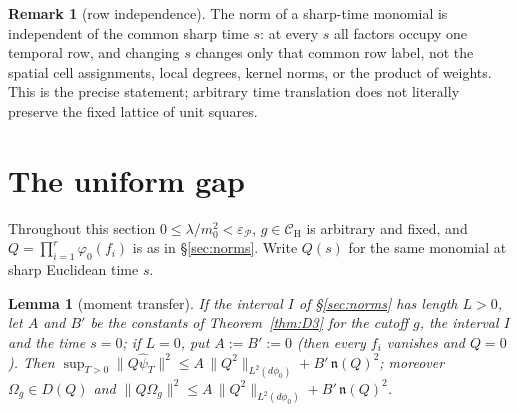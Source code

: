 \documentclass[11pt,a4paper]{article}
\theoremstyle{plain}
\newtheorem{lemma}[theorem]{Lemma}
\theoremstyle{definition}
\newtheorem{remark}[theorem]{Remark}
\theoremstyle{plain}
\theoremstyle{definition}
\newcommand{\CH}{\mathcal{C}_{\mathrm H}}
\newcommand{\Om}{\Omega}
\begin{document}
\begin{remark}[row independence]\label{rem:row}
The norm of a sharp-time monomial is independent of the common sharp time $s$: at every $s$
all factors occupy one temporal row, and changing $s$ changes only that common row label,
not the spatial cell assignments, local degrees, kernel norms, or the product of weights.
This is the precise statement; arbitrary time translation does not literally preserve the
fixed lattice of unit squares.
\end{remark}

\section{The uniform gap}\label{sec:G}

Throughout this section $0\le\lambda/m_0^2<\varepsilon_{\mathscr P}$, $g\in\CH$ is
arbitrary and fixed, and $Q=\prod_{i=1}^r\varphi_0(f_i)$ is as in \S\ref{sec:norms}. Write
$Q(s)$ for the same monomial at sharp Euclidean time $s$.

\begin{lemma}[moment transfer]\label{lem:transfer}
If the interval $I$ of \S\ref{sec:norms} has length $L>0$, let $A$ and $B'$ be the
constants of Theorem~\ref{thm:D3} for the cutoff $g$, the interval $I$ and the time $s=0$;
if $L=0$, put $A:=B':=0$ (then every $f_i$ vanishes and $Q=0$).  Then
$\displaystyle\sup_{T>0}\|Q\hat\psi_T\|^2\le A\,\|Q^2\|_{L^2(d\phi_0)}+B'\,\mathfrak n(Q)^2$;
moreover $\Om_g\in D(Q)$ and $\|Q\Om_g\|^2\le A\,\|Q^2\|_{L^2(d\phi_0)}+B'\,\mathfrak n(Q)^2$.
\end{lemma}
\end{document}
